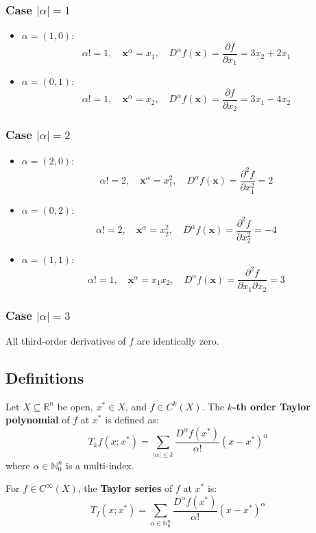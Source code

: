\documentclass{article}
\begin{document}
\subsubsection{Case \( |\alpha| = 1 \)}
\begin{itemize}
    \item \( \alpha = (1, 0) \):
    \[
    \alpha! = 1, \quad \bm{x}^\alpha = x_1, \quad D^\alpha f(\bm{x}) = \frac{\partial f}{\partial x_1} = 3x_2 + 2x_1
    \]
    \item \( \alpha = (0, 1) \):
    \[
    \alpha! = 1, \quad \bm{x}^\alpha = x_2, \quad D^\alpha f(\bm{x}) = \frac{\partial f}{\partial x_2} = 3x_1 - 4x_2
    \]
\end{itemize}

\subsubsection{Case \( |\alpha| = 2 \)}
\begin{itemize}
    \item \( \alpha = (2, 0) \):
    \[
    \alpha! = 2, \quad \bm{x}^\alpha = x_1^2, \quad D^\alpha f(\bm{x}) = \frac{\partial^2 f}{\partial x_1^2} = 2
    \]
    \item \( \alpha = (0, 2) \):
    \[
    \alpha! = 2, \quad \bm{x}^\alpha = x_2^2, \quad D^\alpha f(\bm{x}) = \frac{\partial^2 f}{\partial x_2^2} = -4
    \]
    \item \( \alpha = (1, 1) \):
    \[
    \alpha! = 1, \quad \bm{x}^\alpha = x_1x_2, \quad D^\alpha f(\bm{x}) = \frac{\partial^2 f}{\partial x_1 \partial x_2} = 3
    \]
\end{itemize}

\subsubsection{Case \( |\alpha| = 3 \)}
All third-order derivatives of \( f \) are identically zero.

\subsection*{Definitions}
Let \( X \subseteq \mathbb{R}^n \) be open, \( x^* \in X \), and \( f \in C^k(X) \). The \textbf{\(k\)-th order Taylor polynomial} of \( f \) at \( x^* \) is defined as:
\[
T_k f(x; x^*) = \sum_{|\alpha| \leq k} \frac{D^\alpha f(x^*)}{\alpha!} (x - x^*)^\alpha
\]
where \( \alpha \in \mathbb{N}_0^n \) is a multi-index.

For \( f \in C^\infty(X) \), the \textbf{Taylor series} of \( f \) at \( x^* \) is:
\[
T_f(x; x^*) = \sum_{\alpha \in \mathbb{N}_0^n} \frac{D^\alpha f(x^*)}{\alpha!} (x - x^*)^\alpha
\]
\end{document}

